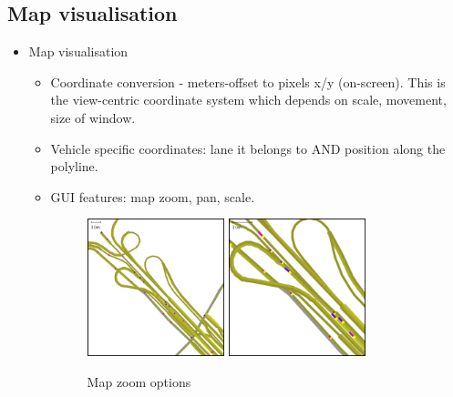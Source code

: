 \subsection{Map visualisation}
\begin{itemize}
    \item Map visualisation
    \begin{itemize}
        \item Coordinate conversion - meters-offset to pixels x/y (on-screen). This is the view-centric coordinate system which depends on scale, movement, size of window.
        \item Vehicle specific coordinates: lane it belongs to AND position along the polyline.
        \item GUI features: map zoom, pan, scale.
            \begin{figure}[!h]
                \vspace{1.5em}
                \caption{Map zoom options}
                \label{fig:mapZoomOptions}
                \centering
                \includegraphics[width=0.4\textwidth]{figs/road/zoom_dots.png}
                \hspace{0.2em}
                \includegraphics[width=0.4\textwidth]{figs/road/zoom_cars.png}
            \end{figure}

    \end{itemize}
\end{itemize}


